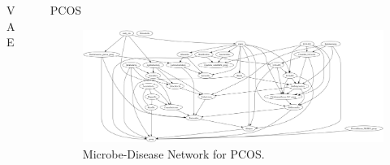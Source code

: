 \documentclass[final]{beamer}
\newlength{\sepwidth}
\newlength{\colwidth}
\newcommand{\separatorcolumn}{\begin{column}{\sepwidth}\end{column}}
\begin{document}
\begin{frame}[t]
\begin{columns}[t]
\begin{column}{\colwidth}
\begin{block}{VAE}
  \end{block}

  
\end{column}

\separatorcolumn

\begin{column}{\colwidth}

   \begin{block}{PCOS}


    \begin{figure}
      \centering
      \includegraphics[width=\linewidth]{../graphs/pcos/cdnod_norm.png}
      \caption{Microbe-Disease Network for PCOS.}
    \end{figure}
    

\end{block}
\end{column}
\end{columns}
\end{frame}
\end{document}
